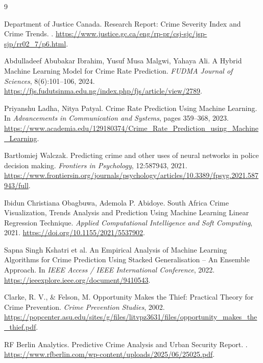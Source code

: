 \documentclass[11pt]{article}
\begin{document}
\begin{thebibliography}{9}

Department of Justice Canada.
\newblock Research Report: Crime Severity Index and Crime Trends.
.
\newblock \url{https://www.justice.gc.ca/eng/rp-pr/csj-sjc/jsp-sjp/rr02_7/p6.html}.

Abdulladeef Abubakar Ibrahim, Yusuf Musa Malgwi, Yahaya Ali.
\newblock A Hybrid Machine Learning Model for Crime Rate Prediction.
\newblock \emph{FUDMA Journal of Sciences}, 8(6):101--106, 2024.
\newblock \url{https://fjs.fudutsinma.edu.ng/index.php/fjs/article/view/2789}.

Priyanshu Ladha, Nitya Patyal.
\newblock Crime Rate Prediction Using Machine Learning.
\newblock In \emph{Advancements in Communication and Systems}, pages 359--368, 2023.
\newblock \url{https://www.academia.edu/129180374/Crime_Rate_Prediction_using_Machine_Learning}.

Bartłomiej Walczak.
\newblock Predicting crime and other uses of neural networks in police decision making.
\newblock \emph{Frontiers in Psychology}, 12:587943, 2021.
\newblock \url{https://www.frontiersin.org/journals/psychology/articles/10.3389/fpsyg.2021.587943/full}.

Ibidun Christiana Obagbuwa, Ademola P. Abidoye.
\newblock South Africa Crime Visualization, Trends Analysis and Prediction Using Machine Learning Linear Regression Technique.
\newblock \emph{Applied Computational Intelligence and Soft Computing}, 2021.
\newblock \url{https://doi.org/10.1155/2021/5537902}.

Sapna Singh Kshatri et al.
\newblock An Empirical Analysis of Machine Learning Algorithms for Crime Prediction Using Stacked Generalisation – An Ensemble Approach.
\newblock In \emph{IEEE Access / IEEE International Conference}, 2022.
\newblock \url{https://ieeexplore.ieee.org/document/9410543}.

Clarke, R. V., & Felson, M.
\newblock Opportunity Makes the Thief: Practical Theory for Crime Prevention.
\newblock \emph{Crime Prevention Studies}, 2002.
\newblock \url{https://popcenter.asu.edu/sites/g/files/litvpz3631/files/opportunity_makes_the_thief.pdf}.

RF Berlin Analytics.
\newblock Predictive Crime Analysis and Urban Security Report.
.
\newblock \url{https://www.rfberlin.com/wp-content/uploads/2025/06/25025.pdf}. 

\end{thebibliography}
\end{document}
